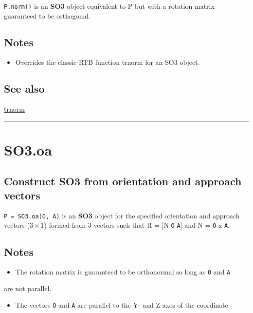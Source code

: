\texttt{P.norm()} is an \textbf{\color{red} SO3} object equivalent to P but with a rotation
matrix guaranteed to be orthogonal.


\subsection*{Notes}
\begin{itemize}
  \item Overrides the classic RTB function trnorm for an SO3 object.
\end{itemize}

\subsection*{See also}


\hyperlink{trnorm}{\color{blue} trnorm}

\vspace{1.5ex}\hrule

\hypertarget{SO3.oa}{\section*{SO3.oa}}
\subsection*{Construct SO3 from orientation and approach vectors}


\texttt{P = SO3.oa(O, A)} is an \textbf{\color{red} SO3} object for the specified
orientation and approach vectors ($3 \times 1$) formed from 3 vectors such that
R = [N \texttt{O} \texttt{A}] and N = \texttt{O} x \texttt{A}.


\subsection*{Notes}
\begin{itemize}
  \item The rotation matrix is guaranteed to be orthonormal so long as \texttt{O} and \texttt{A}
\end{itemize}


are not parallel.

\begin{itemize}
  \item The vectors \texttt{O} and \texttt{A} are parallel to the Y- and Z-axes of the coordinate
\end{itemize}


